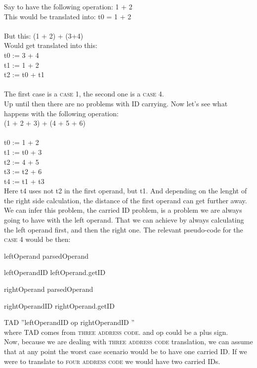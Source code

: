 \documentclass[twocolumn,10ptr]{article}
\begin{document}
	Say to have the following operation: 1 + 2  \\ 
	This would be translated into:  t0 = 1 + 2 \\ 
	\\ 
	But this: (1 + 2) + (3+4) \\
	Would get translated into this: \\
	t0 := 3 + 4 \\
	t1 := 1 + 2 \\
	t2 := t0 + t1 \\
	\\
	The first case is a \textsc{case 1}, the second one is a \textsc{case 4}. \\
	
	Up until then there are no problems with ID carrying. Now let's see what happens with the following operation: \\
	(1 + 2 + 3) + (4 + 5 + 6) \\
	\\
	t0 := 1 + 2 \\
	t1 := t0 + 3 \\
	t2 := 4 + 5 \\
	t3 := t2 + 6 \\
	t4 := t1 + t3 \\
	
	Here t4 uses not t2 in the first operand, but t1. And depending on the lenght of the right side calculation, the distance 
	of the first operand can get further away.\\
	
	We can infer this problem, the carried ID problem, is a problem we are always going to have with the left operand. 
	That we can achieve by always calculating the left operand first, and then the right one.
	The relevant pseudo-code for the \textsc{case 4} would be then:
	
	
	
	leftOperand \textleftarrow parsedOperand
	
	leftOperandID \textleftarrow leftOperand.getID
	
	rightOperand \textleftarrow parsedOperand
	
	rightOperandID \textleftarrow rightOperand.getID
	
	TAD \textleftarrow ''leftOperandID op rightOperandID ''  \\
	where TAD comes from \textsc{three address code}. and op could be a plus sign. \\
	
	Now, because we are dealing with \textsc{three address code} translation, we can assume that at any point
	the worst case scenario would be to have one carried ID. If we were to translate to \textsc{four address code}
	we would have two carried IDs. 
	
\end{document}
